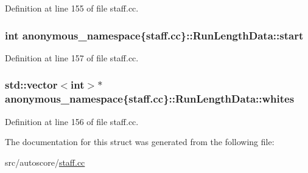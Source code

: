 Definition at line 155 of file staff.\+cc.

\subsubsection[{\texorpdfstring{start}{start}}]{\setlength{\rightskip}{0pt plus 5cm}int anonymous\+\_\+namespace\{staff.\+cc\}\+::Run\+Length\+Data\+::start}\hypertarget{structanonymous__namespace_02staff_8cc_03_1_1RunLengthData_a74e9de2cf82afdb5754a7ec5b6c15817}{}\label{structanonymous__namespace_02staff_8cc_03_1_1RunLengthData_a74e9de2cf82afdb5754a7ec5b6c15817}


Definition at line 157 of file staff.\+cc.

\subsubsection[{\texorpdfstring{whites}{whites}}]{\setlength{\rightskip}{0pt plus 5cm}std\+::vector$<$int$>$$\ast$ anonymous\+\_\+namespace\{staff.\+cc\}\+::Run\+Length\+Data\+::whites}\hypertarget{structanonymous__namespace_02staff_8cc_03_1_1RunLengthData_a3ed6930a2e526ce64cccba0e86ac8c29}{}\label{structanonymous__namespace_02staff_8cc_03_1_1RunLengthData_a3ed6930a2e526ce64cccba0e86ac8c29}


Definition at line 156 of file staff.\+cc.



The documentation for this struct was generated from the following file\+:\begin{DoxyCompactItemize}
\item 
src/autoscore/\hyperlink{staff_8cc}{staff.\+cc}\end{DoxyCompactItemize}
